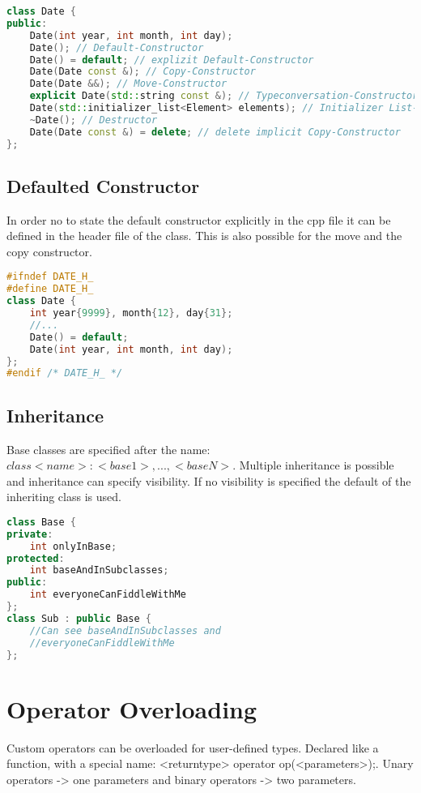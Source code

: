 \begin{lstlisting}[language=C++]
class Date {
public:
    Date(int year, int month, int day);
    Date(); // Default-Constructor
    Date() = default; // explizit Default-Constructor
    Date(Date const &); // Copy-Constructor
    Date(Date &&); // Move-Constructor
    explicit Date(std::string const &); // Typeconversation-Constructor
    Date(std::initializer_list<Element> elements); // Initializer List-Constructor
    ~Date(); // Destructor
    Date(Date const &) = delete; // delete implicit Copy-Constructor
};
\end{lstlisting}

\subsection{Defaulted Constructor}
In order no to state the default constructor explicitly in the cpp file it can be defined in the header file of the class. This is also possible for the move and the copy constructor.
\begin{lstlisting}[language=C++]
#ifndef DATE_H_
#define DATE_H_
class Date {
	int year{9999}, month{12}, day{31};
	//...
	Date() = default;
	Date(int year, int month, int day);
};
#endif /* DATE_H_ */
\end{lstlisting}

\subsection{Inheritance}
 Base classes are specified after the name: $class <name> : <base1>, ... , <baseN>$. Multiple inheritance is possible and inheritance can specify visibility. If no visibility is specified the default of the inheriting class is used.

\begin{lstlisting}[language=C++]
class Base { 
private:
	int onlyInBase; 
protected:
	int baseAndInSubclasses;
public:
	int everyoneCanFiddleWithMe 
};
class Sub : public Base {
	//Can see baseAndInSubclasses and
	//everyoneCanFiddleWithMe 
};	
\end{lstlisting}


\pagebreak
\section{Operator Overloading}
Custom operators can be overloaded for user-defined types. Declared like a function, with a special name: <returntype> operator op(<parameters>);. 
Unary operators -> one parameters and binary operators -> two parameters.


